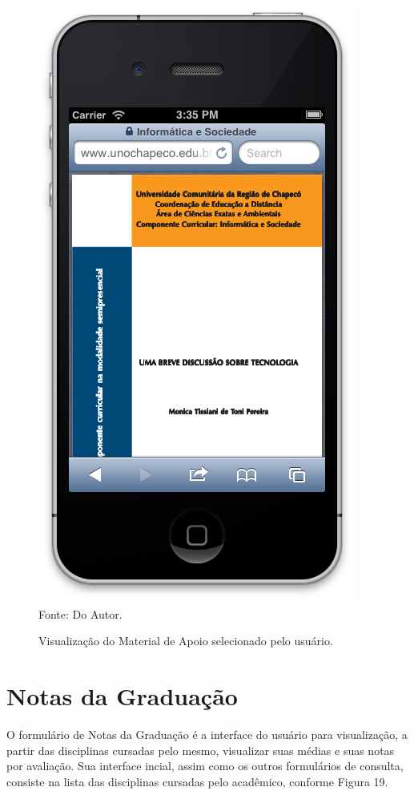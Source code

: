 \begin{figure}[!htb]
     \centering
     \caption[Formulário Material de Apoio - Visualização de Material]{Visualização do Material de Apoio selecionado pelo usuário.}
     \includegraphics[scale=0.5]{imagens/visualizacaomaterialapoio.png}
     \\  Fonte: Do Autor.
\end{figure}
\newpage

\section{Notas da Graduação}
O formulário de Notas da Graduação é a interface do usuário para visualização, a partir das disciplinas cursadas pelo mesmo, visualizar suas médias e suas notas por avaliação. Sua interface incial, assim como os outros formulários de consulta, consiste na lista das disciplinas cursadas pelo acadêmico, conforme Figura 19.

